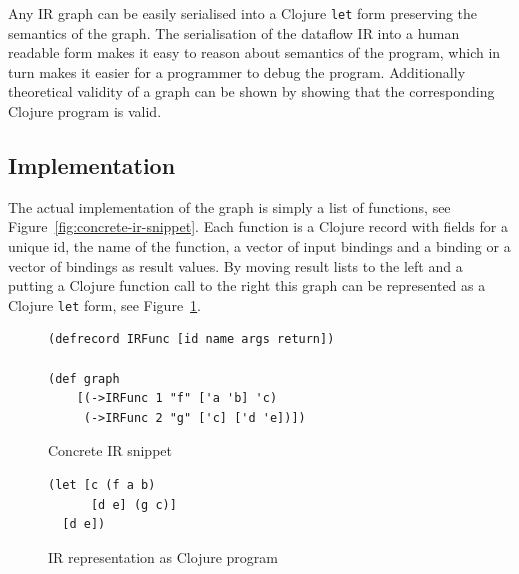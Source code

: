 Any IR graph can be easily serialised into a Clojure \texttt{let} form preserving the semantics of the graph.
The serialisation of the dataflow IR into a human readable form makes it easy to reason about semantics of the program, which in turn makes it easier for a programmer to debug the program.
Additionally theoretical validity of a graph can be shown by showing that the corresponding Clojure program is valid.

\subsection{Implementation}

The actual implementation of the graph is simply a list of functions, see Figure~\ref{fig:concrete-ir-snippet}.
Each function is a Clojure record with fields for a unique id, the name of the function, a vector of input bindings and a binding or a vector of bindings as result values.
By moving result lists to the left and a putting a Clojure function call to the right this graph can be represented as a Clojure \texttt{let} form, see Figure~\ref{fig:ir-as-clojure}.

\begin{figure}
\begin{verbatim}
(defrecord IRFunc [id name args return])

(def graph
	[(->IRFunc 1 "f" ['a 'b] 'c)
	 (->IRFunc 2 "g" ['c] ['d 'e])])

\end{verbatim}
\caption{Concrete IR snippet}
\label{fig:concrete-ir-snippet}
\begin{verbatim}
(let [c (f a b)
      [d e] (g c)]
  [d e])
\end{verbatim}
\caption{IR representation as Clojure program}
\label{fig:ir-as-clojure}
\end{figure}

